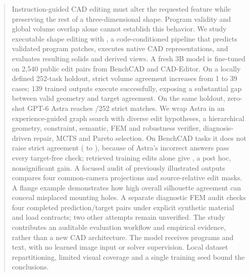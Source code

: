 \begin{abstract}
Instruction-guided CAD editing must alter the requested feature while preserving the rest of a three-dimensional shape. Program validity and global volume overlap alone cannot establish this behavior. We study executable shape editing with \ours, a code-conditioned pipeline that predicts validated program patches, executes native CAD representations, and evaluates resulting solids and derived views. A fresh 3B model is fine-tuned on 2,540 public edit pairs from BenchCAD and CAD-Editor. On a locally defined 252-task holdout, strict volume agreement increases from 1 to 39 cases; 139 trained outputs execute successfully, exposing a substantial gap between valid geometry and target agreement. On the same holdout, zero-shot GPT-6 Astra reaches \paAstra/252 strict matches. We wrap Astra in an experience-guided graph search with diverse edit hypotheses, a hierarchical geometry, constraint, semantic, FEM and robustness verifier, diagnosis-driven repair, MCTS and Pareto selection. On \pipeN{} BenchCAD tasks it does not raise strict agreement (\pipeAstra{} to \pipeFull), because \pipeWrongPass{} of Astra's \pipeWrong{} incorrect answers pass every target-free check; retrieved training edits alone give \pipeRag, a post hoc, nonsignificant gain. A focused audit of previously illustrated outputs compares four common-camera projections and source-relative edit masks. A flange example demonstrates how high overall silhouette agreement can conceal misplaced mounting holes. A separate diagnostic FEM audit checks four completed prediction/target pairs under explicit synthetic material and load contracts; two other attempts remain unverified. The study contributes an auditable evaluation workflow and empirical evidence, rather than a new CAD architecture. The model receives programs and text, with no learned image input or solver supervision. Local dataset repartitioning, limited visual coverage and a single training seed bound the conclusions.
\end{abstract}
